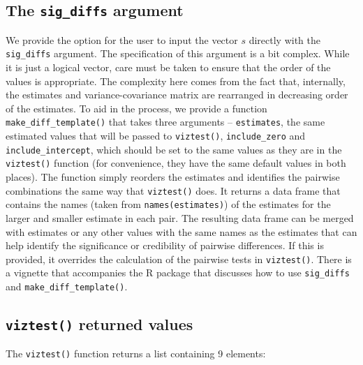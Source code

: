 \subsection{\texorpdfstring{The \texttt{sig\_diffs} argument}{The sig\_diffs argument}}\label{the-sig_diffs-argument}

We provide the option for the user to input the vector \(s\) directly with the \texttt{sig\_diffs} argument. The specification of this argument is a bit complex. While it is just a logical vector, care must be taken to ensure that the order of the values is appropriate. The complexity here comes from the fact that, internally, the estimates and variance-covariance matrix are rearranged in decreasing order of the estimates. To aid in the process, we provide a function \texttt{make\_diff\_template()} that takes three arguments -- \texttt{estimates}, the same estimated values that will be passed to \texttt{viztest()}, \texttt{include\_zero} and \texttt{include\_intercept}, which should be set to the same values as they are in the \texttt{viztest()} function (for convenience, they have the same default values in both places). The function simply reorders the estimates and identifies the pairwise combinations the same way that \texttt{viztest()} does. It returns a data frame that contains the names (taken from \texttt{names(estimates)}) of the estimates for the larger and smaller estimate in each pair. The resulting data frame can be merged with estimates or any other values with the same names as the estimates that can help identify the significance or credibility of pairwise differences. If this is provided, it overrides the calculation of the pairwise tests in \texttt{viztest()}. There is a vignette that accompanies the R package that discusses how to use \texttt{sig\_diffs} and \texttt{make\_diff\_template()}.

\subsection{\texorpdfstring{\texttt{viztest()} returned values}{viztest() returned values}}\label{viztest-returned-values}

The \texttt{viztest()} function returns a list containing 9 elements:


